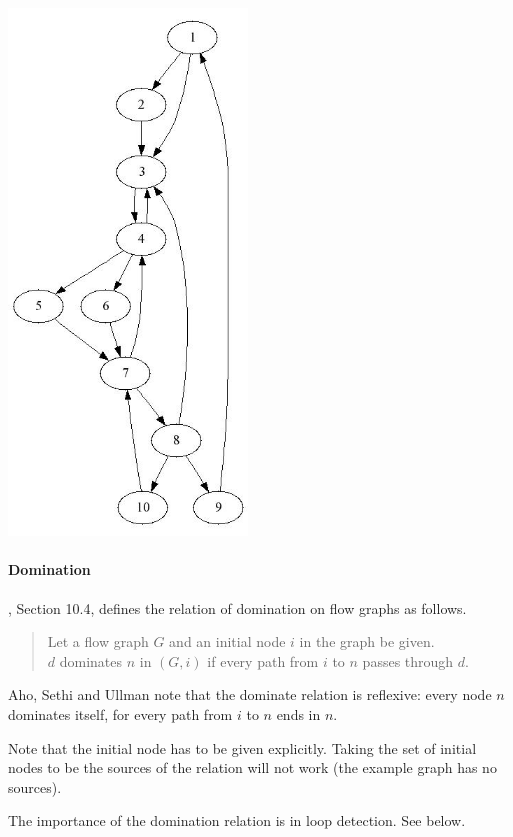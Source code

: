 \documentclass[11pt]{article}
\begin{document}
\begin{center}
\includegraphics[width=2.5in]{flow}
\end{center}

\paragraph{Domination} \mbox{}


\cite{AhoSetUll:cptt}, Section 10.4, defines the relation of domination on 
flow graphs as follows. 
\begin{quote}
 Let a flow graph $G$ and an initial node $i$ in the graph be given. \\
 $d$ dominates $n$ in $(G,i)$ if every path from $i$ to $n$ passes through $d$. 
\end{quote}

Aho, Sethi and Ullman note that the dominate relation is reflexive:
every node $n$ dominates itself, for every path from $i$ to $n$ ends
in $n$.

Note that the initial node has to be given explicitly. Taking the set
of initial nodes to be the sources of the relation will not work (the
example graph has no sources).

The importance of the domination relation is in loop detection. See below. 
\end{document}
